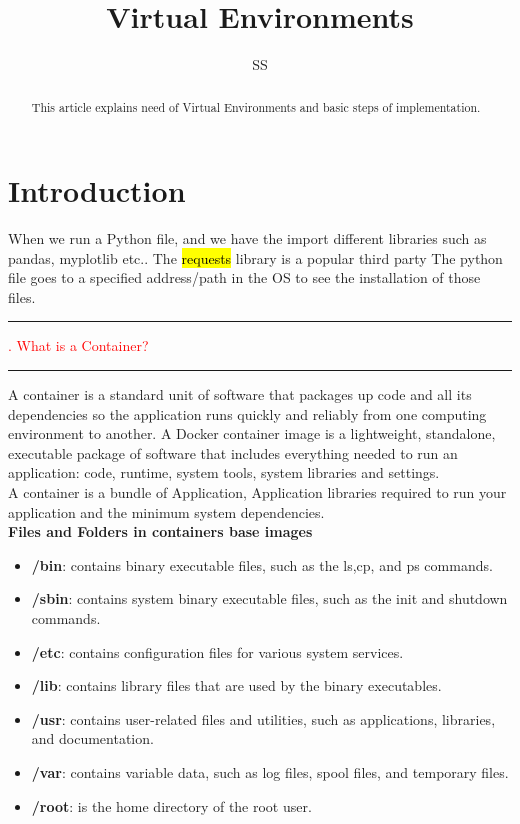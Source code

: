 \documentclass{article}
\title{Virtual Environments}
\author{SS}
\begin{document}
\maketitle

\begin{abstract}
This article explains need of Virtual Environments and basic steps of implementation.
\end{abstract}

\section{Introduction}
When we run a Python file, and we have the import different libraries such as pandas, myplotlib etc.. The \hl{requests} library is a popular third party  The python file goes to a specified address/path in the OS to see the installation of those files.  \\
% 
\noindent
{\color{red} \rule{\linewidth}{0.5mm}}
\textcolor{red}{. What is a Container?} \\
\noindent
{\color{red} \rule{\linewidth}{0.5mm}}
A container is a standard unit of software that packages up code and all its dependencies so the application runs quickly and reliably from one computing environment to another. A Docker container image is a lightweight, standalone, executable package of software that includes everything needed to run an application: code, runtime, system tools, system libraries and settings. \\
A container is a bundle of Application, Application libraries required to run your application and the minimum system dependencies.  
\\
\textbf{Files and Folders in containers base images}
\begin{itemize}
\color{blue}
\item \textbf{/bin}: contains binary executable files, such as the ls,cp, and ps commands.
\item \textbf{/sbin}: contains system binary executable files, such as the init and shutdown commands.
\item \textbf{/etc}: contains configuration files for various system services.
\item \textbf{/lib}: contains library files that are used by the binary executables.
\item \textbf{/usr}: contains user-related files and utilities, such as applications, libraries, and documentation.
\item \textbf{/var}: contains variable data, such as log files, spool files, and temporary files.
\item \textbf{/root}: is the home directory of the root user.
\end{itemize}
\end{document}
